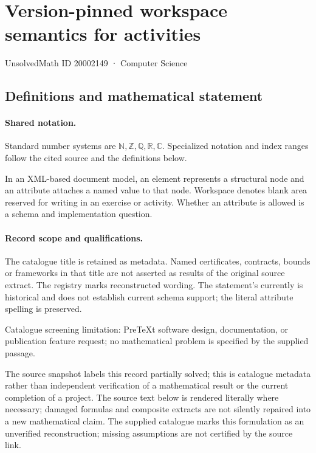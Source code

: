 \documentclass[11pt]{article}
\begin{document}
\setcounter{section}{20002148}
\section{Version-pinned workspace semantics for activities}\label{20002149}
{\small\sffamily UnsolvedMath ID 20002149 · Computer Science}
\subsection{Definitions and mathematical statement}

\paragraph{Shared notation.}Standard number systems are $\mathbb N,\mathbb Z,\mathbb Q,\mathbb R,\mathbb C$. Specialized notation and index ranges follow the cited source and the definitions below.


In an XML-based document model, an element represents a structural node and an attribute attaches a named value to that node. Workspace denotes blank area reserved for writing in an exercise or activity. Whether an attribute is allowed is a schema and implementation question.
\paragraph{Record scope and qualifications.}
The catalogue title is retained as metadata. Named certificates, contracts, bounds or frameworks in that title are not asserted as results of the original source extract.
The registry marks reconstructed wording. The statement's currently is historical and does not establish current schema support; the literal attribute spelling is preserved.

Catalogue screening limitation: PreTeXt software design, documentation, or publication feature request; no mathematical problem is specified by the supplied passage.

The source snapshot labels this record partially solved; this is catalogue metadata rather than independent verification of a mathematical result or the current completion of a project.
The source text below is rendered literally where necessary; damaged formulas and composite extracts are not silently repaired into a new mathematical claim.
The supplied catalogue marks this formulation as an unverified reconstruction; missing assumptions are not certified by the source link.
\end{document}
